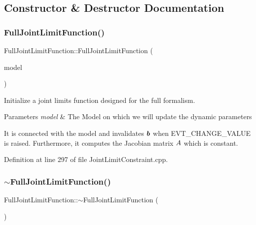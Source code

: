 \subsection{Constructor \& Destructor Documentation}
\hypertarget{classocra_1_1FullJointLimitFunction_af49c77d067fe584cf6d3884eb33b2ed0}{}\label{classocra_1_1FullJointLimitFunction_af49c77d067fe584cf6d3884eb33b2ed0} 
\subsubsection{\texorpdfstring{Full\+Joint\+Limit\+Function()}{FullJointLimitFunction()}}
{\footnotesize\ttfamily Full\+Joint\+Limit\+Function\+::\+Full\+Joint\+Limit\+Function (\begin{DoxyParamCaption}\item[{const Model \&}]{model }\end{DoxyParamCaption})}

Initialize a joint limits function designed for the full formalism.


\begin{DoxyParams}{Parameters}
{\em model} & The Model on which we will update the dynamic parameters\\
\hline
\end{DoxyParams}
It is connected with the model and invalidates $ \mbox{\boldmath${b}$} $ when E\+V\+T\+\_\+\+C\+H\+A\+N\+G\+E\+\_\+\+V\+A\+L\+UE is raised. Furthermore, it computes the Jacobian matrix $ A $ which is constant. 

Definition at line 297 of file Joint\+Limit\+Constraint.\+cpp.

\hypertarget{classocra_1_1FullJointLimitFunction_a84cc9b5e7efdf78fe9a279ef5940871b}{}\label{classocra_1_1FullJointLimitFunction_a84cc9b5e7efdf78fe9a279ef5940871b} 
\subsubsection{\texorpdfstring{$\sim$\+Full\+Joint\+Limit\+Function()}{~FullJointLimitFunction()}}
{\footnotesize\ttfamily Full\+Joint\+Limit\+Function\+::$\sim$\+Full\+Joint\+Limit\+Function (\begin{DoxyParamCaption}{ }\end{DoxyParamCaption})}

